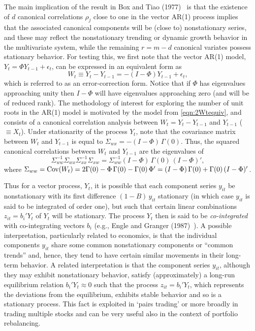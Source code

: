 The main implication of the result in Box and Tiao (1977)~\cite{box77} is that the existence of $d$ canonical correlations $\rho_j$ close to one in the vector AR(1) process implies that the associated canonical components will be (close to) nonstationary series, and these may reflect the nonstationary trending or dynamic growth behavior in the multivariate system, while the remaining $r= m - d$ canonical variates possess stationary behavior. For testing this, we first note that the vector AR(1) model, $Y_t = \Phi Y_{t-1} + \epsilon_t$, can be expressed in an equivalent form as
	\begin{equation} \label{eqn:2Wtequiv}
	W_t \equiv Y_t - Y_{t-1} = - (I - \Phi ) Y_{t-1} + \epsilon_t, 
	\end{equation}
which is referred to as an error-correction form.\label{in:vec1} Notice that if $\Phi$ has eigenvalues approaching unity then $I - \Phi$ will have eigenvalues approaching zero (and will be of reduced rank).  The methodology of interest for exploring the number of unit roots in the AR(1) model is motivated by the model from \eqref{eqn:2Wtequiv}, and consists of a canonical correlation analysis between $W_t = Y_t - Y_{t-1}$ and $Y_{t-1}$ ($\equiv X_t$).  Under stationarity of the process $Y_t$, note that the covariance matrix between $W_t$ and $Y_{t-1}$ is equal to $\Sigma_{wx} = - (I - \Phi )\, \Gamma(0)$.  Thus, the squared canonical correlations between $W_t$ and $Y_{t-1}$ are the eigenvalues of
	\begin{equation} \label{eqn:2doublesigma}
	\Sigma_{ww}^{-1} \Sigma_{wx} \Sigma_{xx}^{-1} \Sigma_{xw}= \Sigma_{ww}^{-1} ( I - \Phi )\, \Gamma(0) \,(I  - \Phi )', 
	\end{equation}
where $\Sigma_{ww} = \operatorname{Cov}(W_t) = 2 \Gamma(0) - \Phi\, \Gamma (0) - \Gamma(0)\, \Phi' = (I - \Phi )\, \Gamma (0) + \Gamma(0) \,( I - \Phi)'$. \twomedskip


Thus for a vector process, $Y_t$, it is possible that each component series $y_{it}$ be nonstationary with its first difference $(1 - B)\, y_{it}$ stationary (in which case $y_{it}$ is said to be integrated of order one), but such that certain linear combinations $z_{it} = b_i' Y_t $ of $Y_t$ will be stationary. The process $Y_t$ then is said to be \emph{co-integrated} with co-integrating vectors $b_i$ (e.g., Engle and Granger (1987)~\cite{engle1987co}).  A possible interpretation, particularly related to economics, is that the individual components $y_{it}$ share some common nonstationary components or ``common trends'' and, hence, they tend to have certain similar movements in their long-term behavior.  A related interpretation is that the component series $y_{it}$, although they may exhibit nonstationary behavior, satisfy (approximately) a long-run equilibrium relation $b_i' Y_t \approx 0$ such that the process $z_{it} = b_i' Y_t$, which represents the deviations from the equilibrium, exhibits stable behavior and so is a stationary process. This fact is exploited in `pairs trading' or more broadly in trading multiple stocks and can be very useful also in the context of portfolio rebalancing. 


